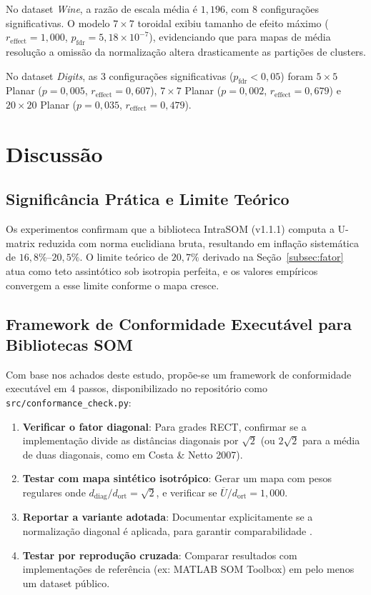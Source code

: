 \documentclass[10pt,journal,compsoc,twocolumn]{IEEEtran}
\begin{document}
No dataset \textit{Wine}, a raz\~ao de escala m\'edia \'e $1{,}196$, com 8
configura\c{c}\~oes significativas. O modelo $7\times7$ toroidal exibiu tamanho
de efeito m\'aximo ($r_\text{effect} = 1{,}000$, $p_\text{fdr} = 5{,}18 \times 10^{-7}$),
evidenciando que para mapas de m\'edia resolu\c{c}\~ao a omiss\~ao da normaliza\c{c}\~ao
altera drasticamente as parti\c{c}\~oes de clusters.

No dataset \textit{Digits}, as 3 configura\c{c}\~oes significativas
($p_\text{fdr} < 0{,}05$) foram $5\times5$ Planar ($p = 0{,}005$, $r_\text{effect} = 0{,}607$),
$7\times7$ Planar ($p = 0{,}002$, $r_\text{effect} = 0{,}679$) e $20\times20$ Planar
($p = 0{,}035$, $r_\text{effect} = 0{,}479$).

\section{Discuss\~ao}
\label{sec:discussao}

\subsection{Signific\^ancia Pr\'atica e Limite Te\'orico}
Os experimentos confirmam que a biblioteca IntraSOM (v1.1.1) \cite{gouvea2023intrasom}
computa a U-matrix reduzida com norma euclidiana bruta, resultando em infla\c{c}\~ao
sistem\'atica de $16{,}8\%$--$20{,}5\%$. O limite te\'orico de $20{,}7\%$ derivado na
Se\c{c}\~ao~\ref{subsec:fator} atua como teto assint\'otico sob isotropia perfeita,
e os valores emp\'iricos convergem a esse limite conforme o mapa cresce.

\subsection{Framework de Conformidade Execut\'avel para Bibliotecas SOM}
\label{subsec:framework}
Com base nos achados deste estudo, prop\~oe-se um framework de conformidade
execut\'avel em 4 passos, disponibilizado no reposit\'orio como \texttt{src/conformance\_check.py}:

\begin{enumerate}
    \item \textbf{Verificar o fator diagonal}: Para grades RECT, confirmar
    se a implementa\c{c}\~ao divide as dist\^ancias diagonais por $\sqrt{2}$
    (ou $2\sqrt{2}$ para a m\'edia de duas diagonais, como em Costa \& Netto 2007).
    \item \textbf{Testar com mapa sint\'etico isotr\'opico}: Gerar um mapa com pesos
    regulares onde $d_\text{diag}/d_\text{ort} = \sqrt{2}$, e verificar se $\overline{U}/d_\text{ort} = 1{,}000$.
    \item \textbf{Reportar a variante adotada}: Documentar explicitamente
    se a normaliza\c{c}\~ao diagonal \'e aplicada, para garantir comparabilidade \cite{flexer2001use}.
    \item \textbf{Testar por reprodu\c{c}\~ao cruzada}: Comparar resultados
    com implementa\c{c}\~oes de refer\^encia (ex: MATLAB SOM Toolbox) em pelo menos um dataset p\'ublico.
\end{enumerate}
\end{document}
